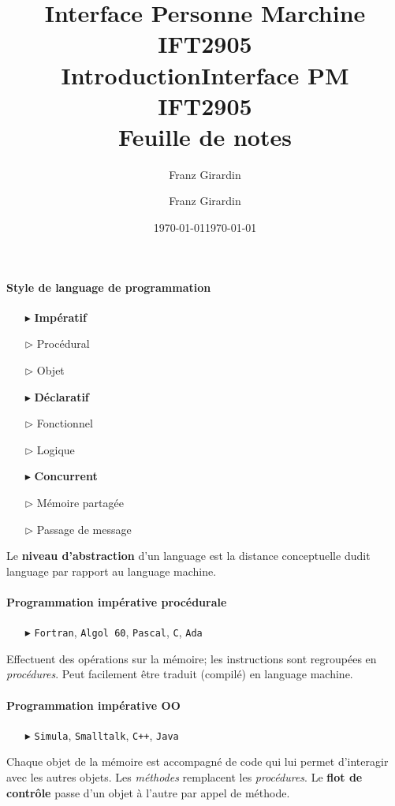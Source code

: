 \documentclass{report}
\title{\Huge{Interface Personne Marchine}\\{IFT2905}\\{\textbf{Introduction}}}
\author{\huge{Franz Girardin}}
\date{\today}
\title{\Huge{Interface PM}\\{IFT2905}\\{\textbf{Feuille de notes}}}
\author{\huge{Franz Girardin}}
\date{\today}
\begin{document}
\maketitle
\pagebreak
\tableofcontents
\pagebreak
\begin{multicols*}{3}


    \footnotesize
    \paragraph{Style de language de programmation} 
    
    \begin{itemize}
        \item [$\blacktriangleright$ ] \textbf{Impératif}   
        \item [$\rhd$ ] Procédural
        \item [$\rhd$ ] Objet 
        \item [$\blacktriangleright$ ] \textbf{Déclaratif}  
        \item [$\rhd$ ] Fonctionnel 
        \item [$\rhd$ ] Logique 
        \item [$\blacktriangleright$ ] \textbf{Concurrent}  
        \item [$\rhd$ ] Mémoire partagée
        \item [$\rhd$ ] Passage de message
    \end{itemize}
    \noindent
    Le \textbf{niveau d'abstraction} d'un language est la distance conceptuelle 
    dudit language par rapport au language machine. 


    \paragraph{Programmation impérative procédurale}
    \begin{itemize}
        \item [$\blacktriangleright$ ]\texttt{Fortran}, \texttt{Algol 60}, \texttt{Pascal}, \texttt{C}, \texttt{Ada}          
    \end{itemize}
    Effectuent des opérations sur la mémoire; les instructions sont regroupées
    en \textit{procédures}. Peut facilement être traduit (compilé) en
    language machine.   


    \paragraph{Programmation impérative OO}
    \begin{itemize}
        \item [$\blacktriangleright$ ] \texttt{Simula}, \texttt{Smalltalk}, \texttt{C++}, \texttt{Java}
    \end{itemize}
    Chaque objet de la mémoire est accompagné de code qui lui permet d'interagir
    avec les autres objets. Les \textit{méthodes} remplacent les
    \textit{procédures}. Le \textbf{flot de contrôle} passe d'un objet à l'autre
    par appel de méthode. 
    


\end{multicols*}
\end{document}
